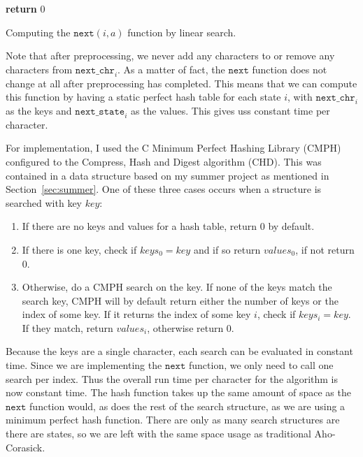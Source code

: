 \documentclass[ %
                    author={Dominic Joseph Moylett},
                    degree={MEng},
                     title={Dictionary Matching with Fingerprints},
                  subtitle={An Empirical Analysis},
                      type={Research},
                      year={2014} ]{dissertation}
\begin{document}
\begin{algorithm}[t]
{\bf return} 0
\caption{Computing the $\texttt{next}(i, a)$ function by linear search.}
\label{alg:ac-search}
\end{algorithm}

Note that after preprocessing, we never add any characters to or remove any characters from $\texttt{next\_chr}_i$. As a matter of fact, the $\texttt{next}$ function does not change at all after preprocessing has completed. This means that we can compute this function by having a static perfect hash table for each state $i$, with $\texttt{next\_chr}_i$ as the keys and $\texttt{next\_state}_i$ as the values. This gives uss constant time per character.

For implementation, I used the C Minimum Perfect Hashing Library (CMPH) configured to the Compress, Hash and Digest algorithm (CHD). This was contained in a data structure based on my summer project as mentioned in Section~\ref{sec:summer}. One of these three cases occurs when a structure is searched with key $key$:

\begin{enumerate}
  \item If there are no keys and values for a hash table, return 0 by default.
  \item If there is one key, check if $keys_0 = key$ and if so return $values_0$, if not return 0.
  \item Otherwise, do a CMPH search on the key. If none of the keys match the search key, CMPH will by default return either the number of keys or the index of some key. If it returns the index of some key $i$, check if $keys_i = key$. If they match, return $values_i$, otherwise return 0.
\end{enumerate}

Because the keys are a single character, each search can be evaluated in constant time. Since we are implementing the $\texttt{next}$ function, we only need to call one search per index. Thus the overall run time per character for the algorithm is now constant time. The hash function takes up the same amount of space as the $\texttt{next}$ function would, as does the rest of the search structure, as we are using a minimum perfect hash function. There are only as many search structures are there are states, so we are left with the same space usage as traditional Aho-Corasick.
\end{document}
